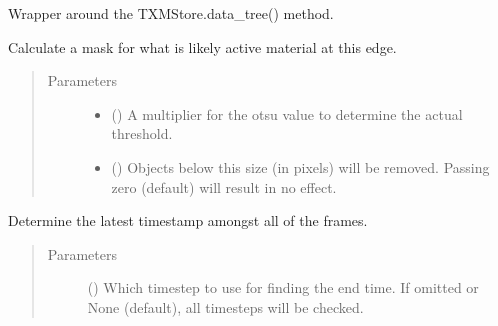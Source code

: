 \documentclass[letterpaper,10pt,english]{sphinxmanual}
\begin{document}
\begin{fulllineitems}

\begin{fulllineitems}
\label{\detokenize{xanespy:xanespy.xanes_frameset.XanesFrameset.data_name}}
\end{fulllineitems}


\begin{fulllineitems}
\label{\detokenize{xanespy:xanespy.xanes_frameset.XanesFrameset.data_tree}}
Wrapper around the TXMStore.data\_tree() method.

\end{fulllineitems}


\begin{fulllineitems}
\label{\detokenize{xanespy:xanespy.xanes_frameset.XanesFrameset.edge_mask}}
Calculate a mask for what is likely active material at this
edge.
\begin{quote}\begin{description}
\item[{Parameters}] \leavevmode\begin{itemize}
\item {} 
 () \textendash{} A multiplier for the otsu value to determine
the actual threshold.

\item {} 
 () \textendash{} Objects below this size (in pixels) will be removed. Passing
zero (default) will result in no effect.

\end{itemize}

\end{description}\end{quote}

\end{fulllineitems}


\begin{fulllineitems}
\label{\detokenize{xanespy:xanespy.xanes_frameset.XanesFrameset.endtime}}
Determine the latest timestamp amongst all of the frames.
\begin{quote}\begin{description}
\item[{Parameters}] \leavevmode
{} (\sphinxstyleliteralemphasis{, }) \textendash{} Which timestep to use for finding the end time. If
omitted or None (default), all timesteps will be checked.


\end{description}
\end{quote}
\end{fulllineitems}
\end{fulllineitems}
\end{document}
